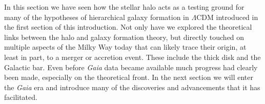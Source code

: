 In this section we have seen how the stellar halo acts as a testing ground for many of the hypotheses of hierarchical galaxy formation in $\Lambda$CDM introduced in the first section of this introduction. Not only have we explored the theoretical links between the halo and galaxy formation theory, but directly touched on multiple aspects of the Milky Way today that can likely trace their origin, at least in part, to a merger or accretion event. These include the thick disk and the Galactic bar. Even before \textit{Gaia} data became available much progress had clearly been made, especially on the theoretical front. In the next section we will enter the \textit{Gaia} era and introduce many of the discoveries and advancements that it has facilitated.